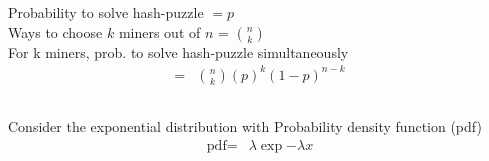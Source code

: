 \section{}
\subsection{}
Probability to solve hash-puzzle  $ = p$ \\ 
Ways to choose $k$ miners out of $n$ = $ \binom{n}{k}$ \\
For k miners, prob. to solve hash-puzzle simultaneously 
\begin{align}
	=& \binom{n}{k} (p)^k (1-p)^{n-k}
\end{align}
\subsection{}
Consider the exponential distribution with Probability density function (pdf)
\begin{align}
	\text{pdf} =& \lambda \exp{-\lambda x} 
\end{align}

